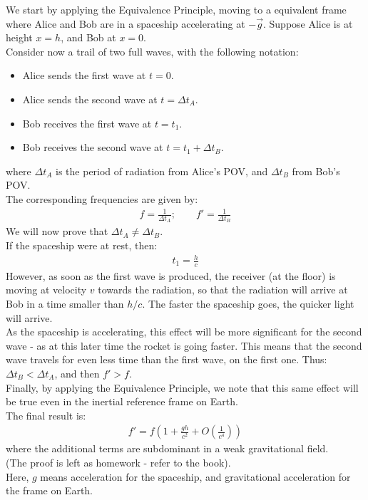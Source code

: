 \documentclass[../template.tex]{subfiles}
\begin{document}
We start by applying the Equivalence Principle, moving to a equivalent frame where Alice and Bob are in a spaceship accelerating at $-\vec{g}$. Suppose Alice is at height $x=h$, and Bob at $x=0$.\\
Consider now a trail of two full waves, with the following notation:
\begin{itemize}
    \item Alice sends the first wave at $t=0$.
    \item Alice sends the second wave at $t=\Delta t_A$.
    \item Bob receives the first wave at $t= t_1$.
    \item Bob receives the second wave at $t=t_1+ \Delta t_B$. 
\end{itemize}
where $\Delta t_A$ is the period of radiation from Alice's POV, and $\Delta t_B$ from Bob's POV.\\
The corresponding frequencies are given by: 
\begin{align*}
    f = \frac{1}{\Delta t_A}; \qquad f' = \frac{1}{\Delta t_B} 
\end{align*}
We will now prove that $\Delta t_A \neq \Delta t_B$.\\

If the spaceship were at rest, then:
\begin{align*}
    t_1 = \frac{h}{c} 
\end{align*}
However, as soon as the first wave is produced, the receiver (at the floor) is moving at velocity $v$ towards the radiation, so that the radiation will arrive at Bob in a time smaller than $h/c$. The faster the spaceship goes, the quicker light will arrive.\\
As the spaceship is accelerating, this effect will be more significant for the second wave - as at this later time the rocket is going faster. This means that the second wave travels for even less time than the first wave,  on the first one. Thus: $\Delta t_B < \Delta t_A$, and then $f' > f$.\\

Finally, by applying the Equivalence Principle, we note that this same effect will be true even in the inertial reference frame on Earth.\\

The final result is:
\begin{align*}
    f' = f \left(1 + \frac{gh}{c^2} + O\left(\frac{1}{c^4} \right) \right)
\end{align*}
where the additional terms are subdominant in a weak gravitational field.\\
(The proof is left as homework - refer to the book).\\
Here, $g$ means acceleration for the spaceship, and gravitational acceleration for the frame on Earth.
\end{document}
